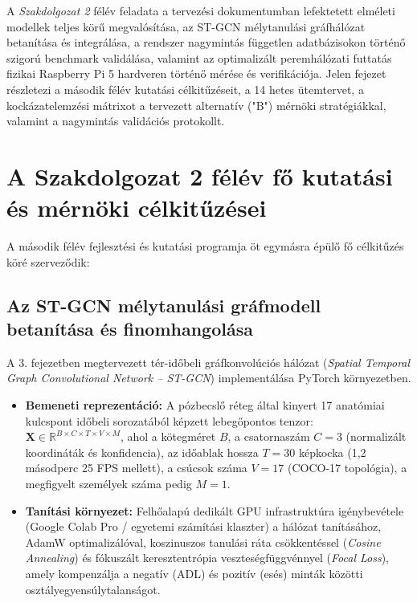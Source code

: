 \documentclass[12pt,a4paper,oneside]{report}
\begin{document}
A \textit{Szakdolgozat 2} félév feladata a tervezési dokumentumban lefektetett elméleti modellek teljes körű megvalósítása, az ST-GCN mélytanulási gráfhálózat betanítása és integrálása, a rendszer nagymintás független adatbázisokon történő szigorú benchmark validálása, valamint az optimalizált peremhálózati futtatás fizikai Raspberry Pi 5 hardveren történő mérése és verifikációja. Jelen fejezet részletezi a második félév kutatási célkitűzéseit, a 14 hetes ütemtervet, a kockázatelemzési mátrixot a tervezett alternatív ("B") mérnöki stratégiákkal, valamint a nagymintás validációs protokollt.

\section{A Szakdolgozat 2 félév fő kutatási és mérnöki célkitűzései}
A második félév fejlesztési és kutatási programja öt egymásra épülő fő célkitűzés köré szerveződik:

\subsection{Az ST-GCN mélytanulási gráfmodell betanítása és finomhangolása}
A 3. fejezetben megtervezett tér-időbeli gráfkonvolúciós hálózat (\textit{Spatial Temporal Graph Convolutional Network -- ST-GCN}) \cite{yan2018stgcn} implementálása PyTorch környezetben.
\begin{itemize}
    \item \textbf{Bemeneti reprezentáció:} A pózbecslő réteg által kinyert 17 anatómiai kulcspont időbeli sorozatából képzett lebegőpontos tenzor: $\mathbf{X} \in \mathbb{R}^{B \times C \times T \times V \times M}$, ahol a kötegméret $B$, a csatornaszám $C=3$ (normalizált koordináták és konfidencia), az időablak hossza $T=30$ képkocka (1,2 másodperc 25 FPS mellett), a csúcsok száma $V=17$ (COCO-17 topológia), a megfigyelt személyek száma pedig $M=1$.
    \item \textbf{Tanítási környezet:} Felhőalapú dedikált GPU infrastruktúra igénybevétele (Google Colab Pro / egyetemi számítási klaszter) a hálózat tanításához, AdamW optimalizálóval, koszinuszos tanulási ráta csökkentéssel (\textit{Cosine Annealing}) és fókuszált keresztentrópia veszteségfüggvénnyel (\textit{Focal Loss}), amely kompenzálja a negatív (ADL) és pozitív (esés) minták közötti osztályegyensúlytalanságot.
\end{itemize}
\end{document}
